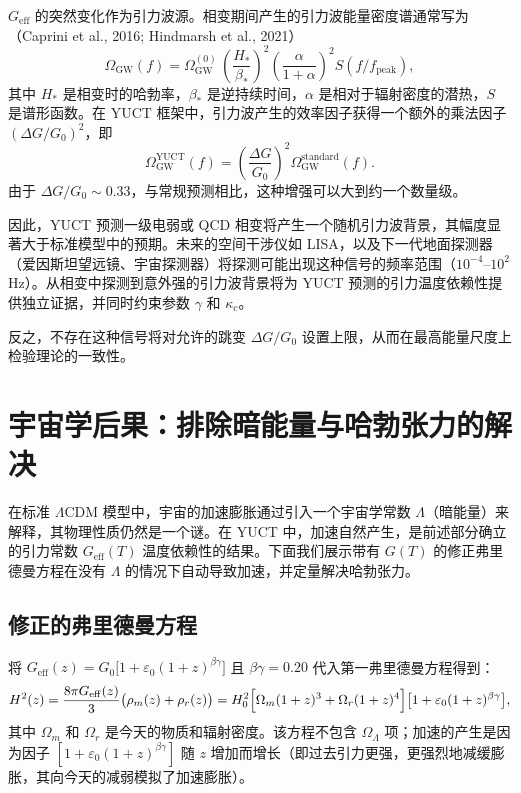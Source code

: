\documentclass[12pt]{article}
\theoremstyle{remark}
\begin{document}
	$G_{\mathrm{eff}}$ 的突然变化作为引力波源。相变期间产生的引力波能量密度谱通常写为（Caprini et al., 2016; Hindmarsh et al., 2021）
	\begin{equation}
		\Omega_{\mathrm{GW}}(f) = \Omega_{\mathrm{GW}}^{(0)} \,
		\left(\frac{H_*}{\beta_*}\right)^2 \left(\frac{\alpha}{1+\alpha}\right)^2 
		S(f/f_{\mathrm{peak}}),
	\end{equation}
	其中 $H_*$ 是相变时的哈勃率，$\beta_*$ 是逆持续时间，$\alpha$ 是相对于辐射密度的潜热，$S$ 是谱形函数。在 YUCT 框架中，引力波产生的效率因子获得一个额外的乘法因子 $(\Delta G/G_0)^2$，即
	\begin{equation}
		\Omega_{\mathrm{GW}}^{\mathrm{YUCT}}(f) = \left(\frac{\Delta G}{G_0}\right)^2 
		\Omega_{\mathrm{GW}}^{\mathrm{standard}}(f).
	\end{equation}
	由于 $\Delta G/G_0\sim 0.33$，与常规预测相比，这种增强可以大到约一个数量级。
	
	因此，YUCT 预测一级电弱或 QCD 相变将产生一个随机引力波背景，其幅度显著大于标准模型中的预期。未来的空间干涉仪如 LISA，以及下一代地面探测器（爱因斯坦望远镜、宇宙探测器）将探测可能出现这种信号的频率范围（$10^{-4}$–$10^{2}$ Hz）。从相变中探测到意外强的引力波背景将为 YUCT 预测的引力温度依赖性提供独立证据，并同时约束参数 $\gamma$ 和 $\kappa_c$。
	
	反之，不存在这种信号将对允许的跳变 $\Delta G/G_0$ 设置上限，从而在最高能量尺度上检验理论的一致性。
	
	\section{宇宙学后果：排除暗能量与哈勃张力的解决}
	\label{sec:cosmo-consequences}
	
	在标准 $\Lambda$CDM 模型中，宇宙的加速膨胀通过引入一个宇宙学常数 $\Lambda$（暗能量）来解释，其物理性质仍然是一个谜。在 YUCT 中，加速自然产生，是前述部分确立的引力常数 $G_{\mathrm{eff}}(T)$ 温度依赖性的结果。下面我们展示带有 $G(T)$ 的修正弗里德曼方程在没有 $\Lambda$ 的情况下自动导致加速，并定量解决哈勃张力。
	
	\subsection{修正的弗里德曼方程}
	
	将 $G_{\mathrm{eff}}(z) = G_0\bigl[1 + \varepsilon_0 (1+z)^{\beta\gamma}\bigr]$ 且 $\beta\gamma = 0.20$ 代入第一弗里德曼方程得到：
	\begin{equation}
		H^2(z) = \frac{8\pi G_{\mathrm{eff}}(z)}{3} \bigl(\rho_m(z) + \rho_r(z)\bigr) = H_0^2\Bigl[\Omega_m (1+z)^3 + \Omega_r (1+z)^4\Bigr]\bigl[1 + \varepsilon_0 (1+z)^{\beta\gamma}\bigr],
		\label{eq:friedman_yuct}
	\end{equation}
	其中 $\Omega_m$ 和 $\Omega_r$ 是今天的物质和辐射密度。该方程不包含 $\Omega_\Lambda$ 项；加速的产生是因为因子 $[1 + \varepsilon_0 (1+z)^{\beta\gamma}]$ 随 $z$ 增加而增长（即过去引力更强，更强烈地减缓膨胀，其向今天的减弱模拟了加速膨胀）。
	
\end{document}

